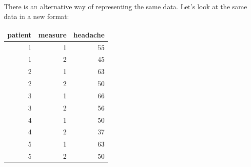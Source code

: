 \documentclass[]{report}\usepackage[]{graphicx}\usepackage[]{color}
\newenvironment{knitrout}{}{} %
\begin{document}
There is an alternative way of representing the same data. Let's look at the same data in a new format:
\begin{knitrout}
\color{fgcolor}
\begin{tabular}{r|r|r}
\hline
patient & measure & headache\\
\hline
1 & 1 & 55\\
\hline
1 & 2 & 45\\
\hline
2 & 1 & 63\\
\hline
2 & 2 & 50\\
\hline
3 & 1 & 66\\
\hline
3 & 2 & 56\\
\hline
4 & 1 & 50\\
\hline
4 & 2 & 37\\
\hline
5 & 1 & 63\\
\hline
5 & 2 & 50\\
\hline
\end{tabular}


\end{knitrout}
\end{document}
